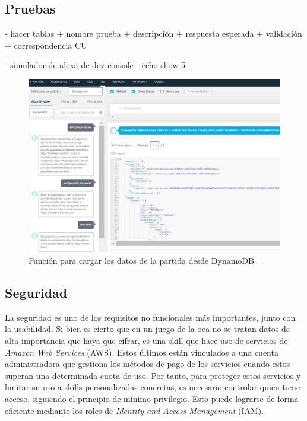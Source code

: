 \newpage

\subsection{Pruebas}
- hacer tablas
+ nombre prueba
+ descripción
+ respuesta esperada
+ validación
+ correspondencia CU

- simulador de alexa de dev console
- echo show 5

\begin{figure}[H]
	\centering
	\includegraphics[width=1\textwidth]{imgs/test-1.jpg}
	\caption{Función para cargar los datos de la partida desde DynamoDB}
	\label{fig:test-1}
\end{figure}

\subsection{Seguridad}

La seguridad es uno de los requisitos no funcionales más importantes, junto con la usabilidad. Si bien es cierto que en un juego de la oca no se tratan datos de alta importancia que haya que cifrar, es una skill que hace uso de servicios de \textit{Amazon Web Services} (AWS). Estos últimos están vinculados a una cuenta administradora que gestiona los métodos de pago de los servicios cuando estos superan una determinada cuota de uso. Por tanto, para proteger estos servicios y limitar su uso a skills personalizadas concretas, es necesario controlar quién tiene acceso, siguiendo el principio de mínimo privilegio. Esto puede lograrse de forma eficiente mediante los roles de \textit{Identity and Access Management} (IAM).

